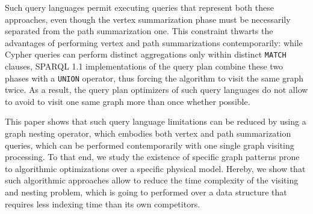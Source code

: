 Such query languages permit executing queries that represent both these approaches, even though  the vertex summarization phase must be necessarily separated from the path summarization one. This constraint thwarts the advantages of performing vertex and path summarizations contemporarily: while Cypher queries can perform distinct aggregations only within distinct \texttt{MATCH} clauses, SPARQL 1.1 implementations of the query plan combine these two phases with a \texttt{UNION} operator, thus forcing the algorithm to visit the same graph twice. As a result, the query plan optimizers of such query languages do not allow to avoid to visit one same graph more than once whether possible.  

This paper shows that such query language limitations can be reduced by using a graph nesting operator, which embodies both vertex and path summarization queries, which can be performed contemporarily with one single graph visiting processing. %
To that end, we study the existence of specific graph patterns prone to algorithmic optimizations over a specific physical model. Hereby, we show that such algorithmic approaches allow to reduce the time complexity of the visiting and nesting problem, which is going to performed over a data structure that requires less indexing time than its own competitors.

